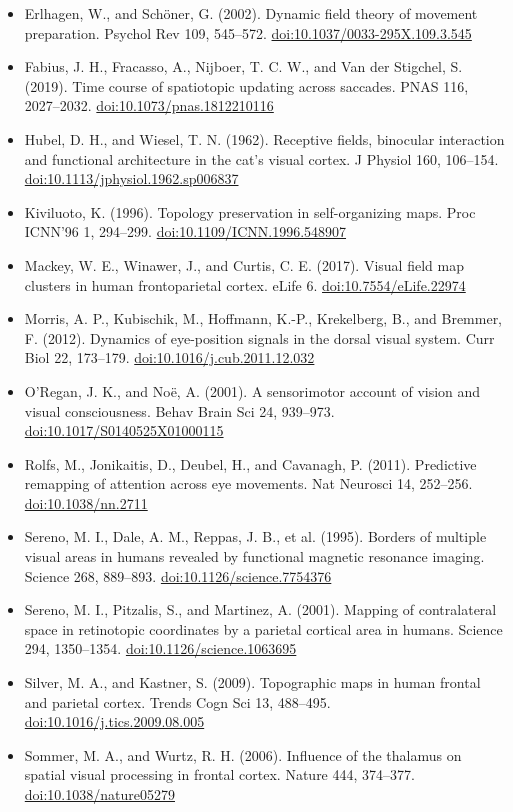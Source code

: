 \documentclass[11pt,a4paper]{article}
\newcommand{\doi}[1]{\href{https://doi.org/#1}{doi:#1}}
\begin{document}
\begin{itemize}[itemsep=1pt,topsep=2pt]
  \item Erlhagen, W., and Sch\"oner, G. (2002). Dynamic field theory of movement preparation. Psychol Rev 109, 545--572. \doi{10.1037/0033-295X.109.3.545}
  \item Fabius, J. H., Fracasso, A., Nijboer, T. C. W., and Van der Stigchel, S. (2019). Time course of spatiotopic updating across saccades. PNAS 116, 2027--2032. \doi{10.1073/pnas.1812210116}
  \item Hubel, D. H., and Wiesel, T. N. (1962). Receptive fields, binocular interaction and functional architecture in the cat's visual cortex. J Physiol 160, 106--154. \doi{10.1113/jphysiol.1962.sp006837}
  \item Kiviluoto, K. (1996). Topology preservation in self-organizing maps. Proc ICNN'96 1, 294--299. \doi{10.1109/ICNN.1996.548907}
  \item Mackey, W. E., Winawer, J., and Curtis, C. E. (2017). Visual field map clusters in human frontoparietal cortex. eLife 6. \doi{10.7554/eLife.22974}
  \item Morris, A. P., Kubischik, M., Hoffmann, K.-P., Krekelberg, B., and Bremmer, F. (2012). Dynamics of eye-position signals in the dorsal visual system. Curr Biol 22, 173--179. \doi{10.1016/j.cub.2011.12.032}
  \item O'Regan, J. K., and No\"e, A. (2001). A sensorimotor account of vision and visual consciousness. Behav Brain Sci 24, 939--973. \doi{10.1017/S0140525X01000115}
  \item Rolfs, M., Jonikaitis, D., Deubel, H., and Cavanagh, P. (2011). Predictive remapping of attention across eye movements. Nat Neurosci 14, 252--256. \doi{10.1038/nn.2711}
  \item Sereno, M. I., Dale, A. M., Reppas, J. B., et al. (1995). Borders of multiple visual areas in humans revealed by functional magnetic resonance imaging. Science 268, 889--893. \doi{10.1126/science.7754376}
  \item Sereno, M. I., Pitzalis, S., and Martinez, A. (2001). Mapping of contralateral space in retinotopic coordinates by a parietal cortical area in humans. Science 294, 1350--1354. \doi{10.1126/science.1063695}
  \item Silver, M. A., and Kastner, S. (2009). Topographic maps in human frontal and parietal cortex. Trends Cogn Sci 13, 488--495. \doi{10.1016/j.tics.2009.08.005}
  \item Sommer, M. A., and Wurtz, R. H. (2006). Influence of the thalamus on spatial visual processing in frontal cortex. Nature 444, 374--377. \doi{10.1038/nature05279}

\end{itemize}
\end{document}

